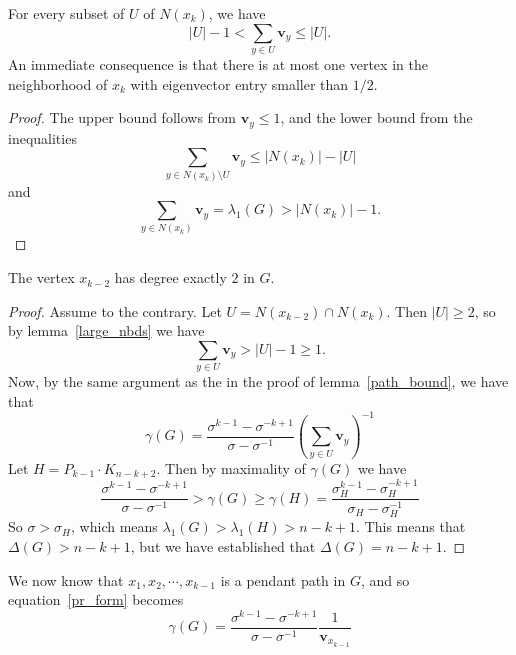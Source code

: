\begin{lemma}\label{large_nbds}
  For every subset of $U$ of $N(x_k)$, we have
   \[ |U| - 1 < \sum_{y \in U} \mathbf{v}_y \leq |U|. \]
  An immediate consequence is that there is at most one
  vertex in the neighborhood of $x_k$ with eigenvector
  entry smaller than $1/2$.
\end{lemma}
\begin{proof}
  The upper bound follows from $\mathbf{v}_y \leq 1$, and the lower bound from
  the inequalities
   \[ \sum_{y \in N(x_k) \setminus U} \mathbf{v}_y  \leq |N(x_k)| - |U|\]
  and
   \[ \sum_{y \in N(x_k)} \mathbf{v}_y = \lambda_1(G) > |N(x_k)| - 1 .\]
\end{proof}

\begin{lemma}\label{k_2_lemma}
 The vertex $x_{k-2}$ has degree exactly $2$ in $G$.
\end{lemma}
\begin{proof}
  Assume to the contrary.  Let $U = N(x_{k-2}) \cap N(x_{k})$.  Then
  $|U| \geq 2$, so by lemma~\ref{large_nbds} we have
   \[ \sum_{y \in U} \mathbf{v}_y > |U| - 1 \geq 1 . \]
  Now, by the same argument as the in the proof of lemma~\ref{path_bound},
  we have that
   \[ \gamma(G) = \frac{\sigma^{k-1} - \sigma^{-k+1}}{\sigma - \sigma^{-1}} \left( \sum_{y \in U} \mathbf{v}_y \right)^{-1} \]
  Let $H = P_{k-1} \cdot K_{n-k+2}$.  Then by maximality of $\gamma(G)$ we have
  \begin{equation*}
   \frac{\sigma^{k-1} - \sigma^{-k+1}}{\sigma - \sigma^{-1}} > \gamma(G) \geq \gamma(H) = \frac{\sigma_H^{k-1} - \sigma_H^{-k+1}}{\sigma_H - \sigma_H^{-1}} 
  \end{equation*}
  So $\sigma > \sigma_H$, which means $\lambda_1(G) > \lambda_1(H) > n-k+1$.
  This means that $\Delta(G) > n-k+1$, but we have established that
  $\Delta(G) = n-k+1$.
\end{proof}

We now know that $x_1, x_2, \cdots, x_{k-1}$ is a pendant path in $G$, and
so equation~\ref{pr_form} becomes
\begin{equation}\label{pr_form2}
 \gamma(G) = \frac{\sigma^{k-1} - \sigma^{-k+1}}{\sigma-\sigma^{-1}} \frac{1}{\mathbf{v}_{x_{k-1}}}
\end{equation}

